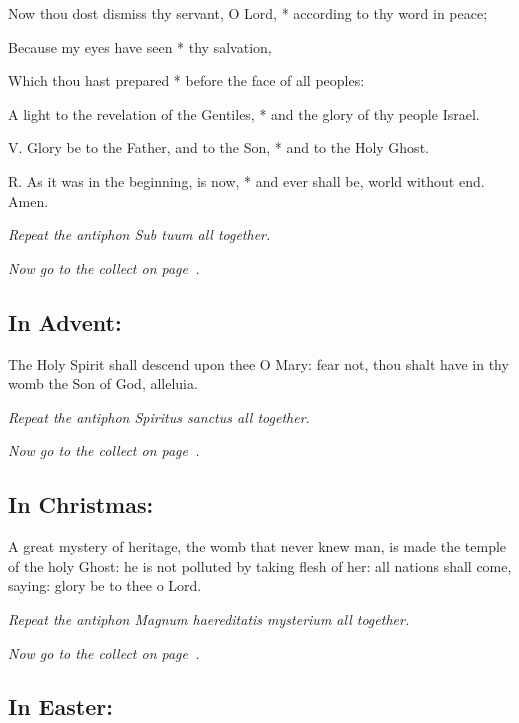 \documentclass[12pt,a5paper]{memoir}
\newcommand{\rubrics}[1]{\noindent\textit{#1}}
\begin{document}
Now thou dost dismiss thy servant, O Lord, * according to thy word in peace;

Because my eyes have seen * thy salvation,

Which thou hast prepared * before the face of all peoples:

A light to the revelation of the Gentiles, * and the glory of thy people Israel.

V. Glory be to the Father, and to the Son, * and to the Holy Ghost.

R. As it was in the beginning, is now, * and ever shall be, world without end. Amen.


\rubrics{Repeat the antiphon \emph{Sub tuum} all together.}

\rubrics{Now go to the collect on page~\pageref{collect}.}

\subsection*{In Advent:}


The Holy Spirit shall descend upon thee O Mary: fear not, thou shalt have in thy womb the Son of God, alleluia.


\rubrics{Repeat the antiphon \emph{Spiritus sanctus} all together.}

\rubrics{Now go to the collect on page~\pageref{collect}.}


\subsection*{In Christmas:}


A great mystery of heritage, the womb that never knew man, is made the temple of the holy Ghost: he is not polluted by taking flesh of her: all nations shall come, saying: glory be to thee o Lord.


\rubrics{Repeat the antiphon \emph{Magnum haereditatis mysterium} all together.}

\rubrics{Now go to the collect on page~\pageref{collect}.}



\subsection*{In Easter:}
\end{document}
